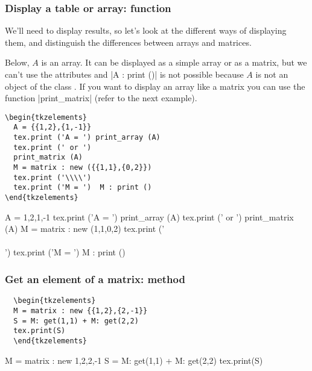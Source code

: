 \subsubsection{Display a table or array: function } %
\label{ssub:display_a_table_or_array_function_code_print_array}

We'll need to display results, so let's look at the different ways of displaying them, and distinguish the differences between arrays and matrices.

Below, $A$ is an array. It can be displayed as a simple array or as a matrix, but we can't use the attributes and |A : print ()| is not possible because $A$ is not an object of the class . If you want to display an array like a matrix you can use the function |print_matrix| (refer to the next example).

\vspace{.5em}
\begin{minipage}{.5\textwidth}
\begin{Verbatim}
\begin{tkzelements}
  A = {{1,2},{1,-1}}
  tex.print ('A = ') print_array (A)
  tex.print (' or ')
  print_matrix (A)
  M = matrix : new ({{1,1},{0,2}})
  tex.print ('\\\\')
  tex.print ('M = ')  M : print ()
\end{tkzelements}
\end{Verbatim}
\end{minipage}
 \begin{minipage}{.5\textwidth}
\begin{tkzelements}
  A = {{1,2},{1,-1}}
  tex.print ('A = ') print_array (A)
  tex.print (' or ')
  print_matrix (A)
  M = matrix : new ({{1,1},{0,2}})
  tex.print ('\\\\')
  tex.print ('M = ')  M : print ()
\end{tkzelements}
 \end{minipage}



\subsubsection{Get an element of a matrix: method  } %
\label{ssub:get_an_element_of_a_matrix}

\begin{minipage}{.5\textwidth}
\begin{Verbatim}
  \begin{tkzelements}
  M = matrix : new {{1,2},{2,-1}}
  S = M: get(1,1) + M: get(2,2)
  tex.print(S)
  \end{tkzelements}
\end{Verbatim}
\end{minipage}
\begin{minipage}{.5\textwidth}
\begin{tkzelements}
M = matrix : new {{1,2},{2,-1}}
S = M: get(1,1) + M: get(2,2)
tex.print(S)
\end{tkzelements}
\end{minipage}



